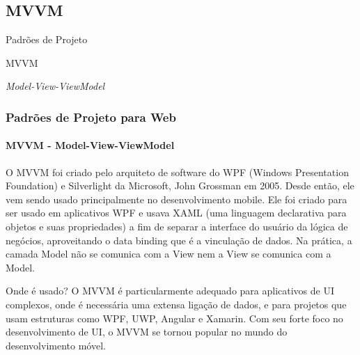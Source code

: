 \documentclass[
	9pt, %
	t, %
]{beamer}
\begin{document}

\subsection{MVVM}

\begin{frame}
	\begin{center}
		
		\bigskip\bigskip\bigskip\bigskip %
		{\Large Padrões de Projeto}
		
		\bigskip\bigskip %
		{\Huge MVVM}
		
		\smallskip
		{\small \textit{Model-View-ViewModel}}
	\end{center}

\end{frame}




\begin{frame}
	\frametitle{Padrões de Projeto para Web}
	\framesubtitle{MVVM - Model-View-ViewModel}

	O MVVM foi criado pelo arquiteto de software do WPF  (Windows Presentation Foundation) e Silverlight da Microsoft, John Grossman em 2005. Desde então, ele vem sendo usado principalmente no desenvolvimento mobile. Ele foi criado para ser usado em aplicativos WPF e usava XAML (uma linguagem declarativa para objetos e suas propriedades) a fim de separar a interface do usuário da lógica de negócios, aproveitando o data binding que é a vinculação de dados. Na prática, a camada Model não se comunica com a View nem a View se comunica com a Model.

	\begin{block}{Onde é usado?}
		O MVVM é particularmente adequado para aplicativos de \alert{UI complexos}, onde é necessária uma extensa ligação de dados, e para projetos que usam estruturas como WPF, UWP, Angular e Xamarin. Com seu forte foco no desenvolvimento de UI, o MVVM se tornou popular no mundo do \alert{desenvolvimento móvel}.
	\end{block}

	
\end{frame}
\end{document}
